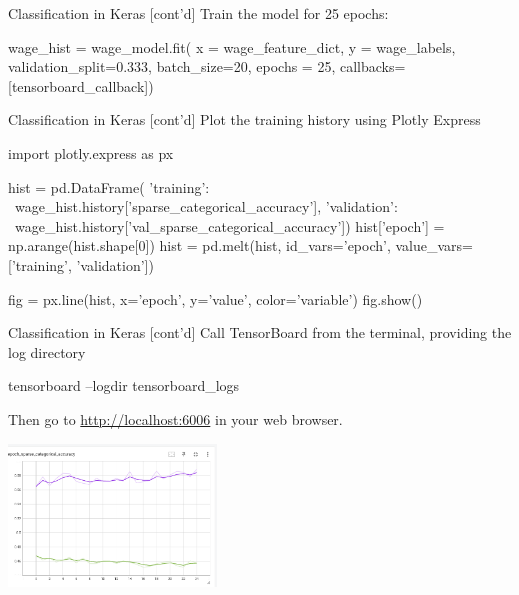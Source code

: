\documentclass[ignorenonframetext,xcolor=x11names]{beamer}
\begin{document}
\begin{frame}[fragile]{Classification in Keras \small [cont'd]}
Train the model for 25 epochs:
\begin{pythoncode}
wage_hist = wage_model.fit(
    x = wage_feature_dict,
    y = wage_labels,
    validation_split=0.333,
    batch_size=20,
    epochs = 25,
    callbacks=[tensorboard_callback])
\end{pythoncode}
\end{frame}

\begin{frame}[fragile]{Classification in Keras \small [cont'd]}
Plot the training history using Plotly Express
\begin{pythoncode}
import plotly.express as px

hist = pd.DataFrame({
    'training': \
wage_hist.history['sparse_categorical_accuracy'],
    'validation': \
wage_hist.history['val_sparse_categorical_accuracy']})
hist['epoch'] = np.arange(hist.shape[0])
hist = pd.melt(hist, 
               id_vars='epoch', 
               value_vars=['training', 'validation'])

fig = px.line(hist, x='epoch', y='value', 
                    color='variable')
fig.show()
\end{pythoncode}
\end{frame}

\begin{frame}[fragile]{Classification in Keras \small [cont'd]}
Call TensorBoard from the terminal, providing the log directory
\begin{bashcode}
tensorboard --logdir tensorboard_logs
\end{bashcode}
Then go to \url{http://localhost:6006} in your web browser.
\vspace{\baselineskip}
\begin{center}
\includegraphics[height=1.5in]{screen11.png}
\end{center}
\end{frame}
\end{document}
